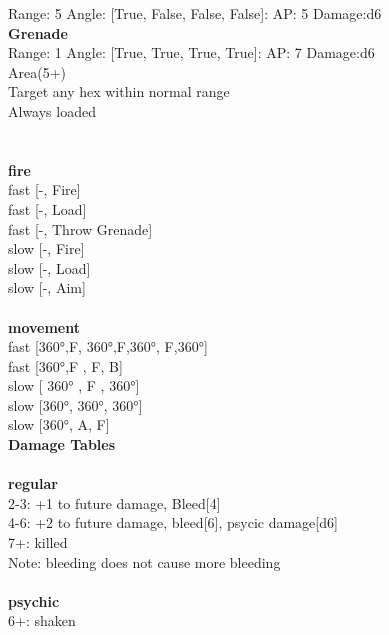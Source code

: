 Range: 5  Angle: [True, False, False, False]: AP: 5 Damage:d6 \\




{\bf Grenade } \\



Range: 1  Angle: [True, True, True, True]: AP: 7 Damage:d6 \\
Area(5+)\\ 
Target any hex within normal range\\ 
Always loaded\\ 




 
\ \\



\ \\ {\bf fire } \\
fast [-, Fire] \\
fast [-, Load] \\
fast [-, Throw Grenade] \\
slow [-, Fire] \\
slow [-, Load] \\
slow [-, Aim] \\
\ \\ {\bf movement } \\
fast [360°,F, 360°,F,360°, F,360°] \\
fast [360°,F , F, B] \\
slow [ 360° ,  F ,  360°] \\
slow [360°, 360°, 360°] \\
slow [360°, A, F] \\


{\bf Damage Tables} \\
\ \\ {\bf regular } \\
2-3: +1 to future damage, Bleed[4] \\
4-6: +2 to future damage, bleed[6], psycic damage[d6] \\
7+: killed \\
Note: bleeding does not cause more bleeding \\
\ \\ {\bf psychic } \\
6+: shaken \\











